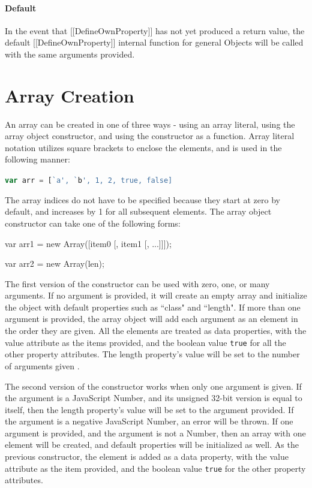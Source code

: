 \documentclass[a4paper,11pt,twoside]{report}
\def\jsinline{\lstinline[language=JavaScript, basicstyle=\small]}%\end{lstlisting}
\begin{document}
\paragraph{Default}
In the event that [[DefineOwnProperty]] has not yet produced a return value, the default [[DefineOwnProperty]] internal function for general Objects will be called with the same arguments provided.

\section{Array Creation}\label{sec:arraycreate}
An array can be created in one of three ways - using an array literal, using the array object constructor, and using the constructor as a function. Array literal notation utilizes square brackets to enclose the elements, and is used in the following manner:
\begin{center}
\jsinline|var arr = [`a', `b', 1, 2, true, false]|
\end{center}

The array indices do not have to be specified because they start at zero by default, and increases by 1 for all subsequent elements. The array object constructor can take one of the following forms:

\begin{adjustwidth}{5cm}{4cm}
\begin{lstjs}
var arr1 = new Array([item0 [, item1 [, ...]]]);

var arr2 = new Array(len);
\end{lstjs}
\end{adjustwidth}

The first version of the constructor can be used with zero, one, or many arguments. If no argument is provided, it will create an empty array and initialize the object with default properties such as ``class" and ``length". If more than one argument is provided, the array object will add each argument as an element in the order they are given. All the elements are treated as data properties, with the value attribute as the items provided, and the boolean value \texttt{true} for all the other property attributes. The length property's value will be set to the number of arguments given \cite{EcmaScript}.

The second version of the constructor works when only one argument is given. If the argument is a JavaScript Number, and its unsigned 32-bit version is equal to itself, then the length property's value will be set to the argument provided. If the argument is a negative JavaScript Number, an error will be thrown. If one argument is provided, and the argument is not a Number, then an array with one element will be created, and default properties will be initialized as well. As the previous constructor, the element is added as a data property, with the value attribute as the item provided, and the boolean value \texttt{true} for the other property attributes. 
\end{document}
